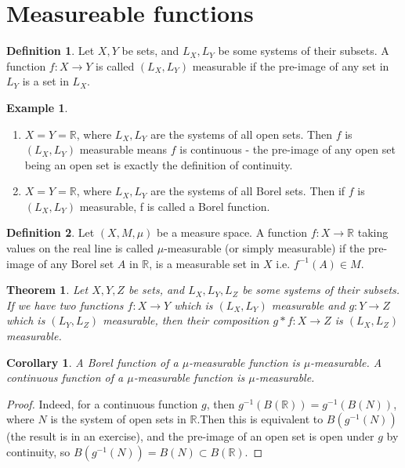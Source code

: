 \documentclass[11pt,a4paper]{report}
\newtheorem{corollary}[theorem]{Corollary}
\theoremstyle{plain}
\newtheorem{thm}{Theorem}[section]
\theoremstyle{definition}
\newtheorem*{defn}{Definition}
\newtheorem*{eg}{Example}
\theoremstyle{remark}
\newcommand{\R}{\mathbb{R}}
\begin{document}
\section{Measureable functions}

\begin{defn}
   Let $X, Y$ be sets, and $L_X, L_Y$ be some systems of their subsets. A function $f: X \rightarrow Y$ is called $(L_X, L_Y)$ measurable if the pre-image of any set in $L_Y$ is a set in $L_X$.
\end{defn}

\begin{eg}
  \begin{enumerate}
    \item $X = Y = \R$, where $L_X, L_Y$ are the systems of all open sets. Then $f$ is $(L_X, L_Y)$ measurable means $f$ is continuous - the pre-image of any open set being an open set is exactly the definition of continuity.
    \item $X = Y = \R$, where $L_X, L_Y$ are the systems of all Borel sets. Then if $f$ is $(L_X, L_Y)$ measurable, f is called a Borel function.
  \end{enumerate}
\end{eg}

\begin{defn}
  Let $(X, M, \mu)$ be a measure space. A function $f: X \rightarrow \R$ taking values on the real line is called $\mu$-measurable (or simply measurable) if the pre-image of any Borel set $A$ in $\R$,  is a measurable set in $X$ i.e. $f^{-1}(A) \in M$.
\end{defn}

\begin{thm}
    Let $X, Y, Z$ be sets, and $L_X, L_Y, L_Z$ be some systems of their subsets. If we have two functions $f: X \rightarrow Y$ which is $(L_X, L_Y)$ measurable and $g: Y \rightarrow Z$ which is $(L_Y, L_Z)$ measurable, then their composition $g * f : X \rightarrow Z$ is $(L_X, L_Z)$ measurable.
\end{thm}

\begin{corollary}
  A Borel function of a $\mu$-measurable function is $\mu$-measurable. A continuous function of a $\mu$-measurable function is $\mu$-measurable.
\end{corollary}

\begin{proof}
  Indeed, for a continuous function $g$, then $g^{-1}(B(\R))  = g^{-1}(B(N))$, where $N$ is the system of open sets in $\R$.Then this is equivalent to $B(g^{-1}(N))$ (the result is in an exercise), and the pre-image of an open set is open under $g$ by continuity, so $B(g^{-1}(N)) = B(N) \subset B(\R)$.
\end{proof}
\end{document}
